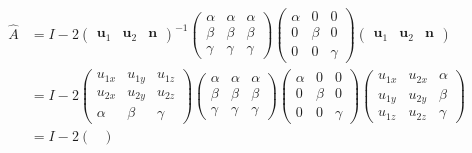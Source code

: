 \documentclass[12pt]{article}
\begin{document}
\begin{equation}
    \begin{split}
        \hat{A} &=
        I - 2\begin{pmatrix}
            \mathbf{u}_{1} & \mathbf{u}_{2} & \mathbf{n}
        \end{pmatrix}^{-1}
        \begin{pmatrix}
            \alpha & \alpha & \alpha \\
            \beta  & \beta  & \beta  \\
            \gamma & \gamma & \gamma
        \end{pmatrix}
        \begin{pmatrix}
            \alpha & 0     & 0      \\
            0      & \beta & 0      \\
            0      & 0     & \gamma
        \end{pmatrix}
        \begin{pmatrix}
            \mathbf{u}_{1} & \mathbf{u}_{2} & \mathbf{n}
        \end{pmatrix} \\
        &=
        I - 2\begin{pmatrix}
            u_{1x} & u_{1y} & u_{1z} \\
            u_{2x} & u_{2y} & u_{2z} \\
            \alpha & \beta  & \gamma
        \end{pmatrix}
        \begin{pmatrix}
            \alpha & \alpha & \alpha \\
            \beta  & \beta  & \beta  \\
            \gamma & \gamma & \gamma
        \end{pmatrix}
        \begin{pmatrix}
            \alpha & 0     & 0      \\
            0      & \beta & 0      \\
            0      & 0     & \gamma
        \end{pmatrix}
        \begin{pmatrix}
            u_{1x} & u_{2x} & \alpha \\
            u_{1y} & u_{2y} & \beta  \\
            u_{1z} & u_{2z} & \gamma
        \end{pmatrix} \\
        &=
        I - 2\begin{pmatrix}

\end{pmatrix}
\end{split}
\end{equation}
\end{document}
